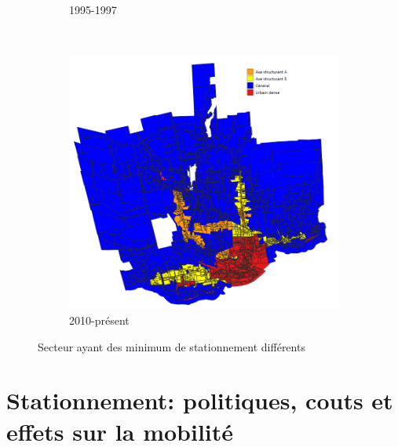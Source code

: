 \begin{figure}[ht]
\begin{subfigure}[t]{0.5\textwidth}
    \caption{1995-1997}
  \end{subfigure}\\
  \begin{subfigure}[t]{0.6\textwidth}
  \centering
  \includegraphics[width=0.8\linewidth]{images/geographie_code_urbanisme_2009_present.png}
  \caption{2010-présent}
  \end{subfigure}
  \caption{Secteur ayant des minimum de stationnement différents}
  \label{fig:types_unites_voisinage}
\end{figure}
\FloatBarrier
  


\section{Stationnement: politiques, couts et effets sur la mobilité}
